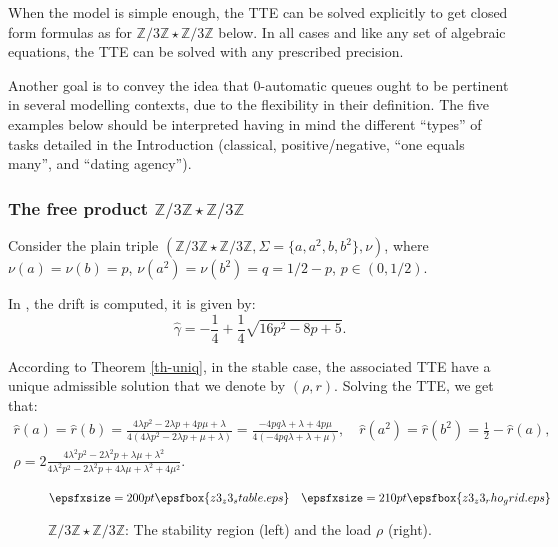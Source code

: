 \documentclass[11pt,a4paper]{article}
\theoremstyle{remark}
\def\Blackboardfont{\mathbb}
\def\Z{{\Blackboardfont Z}}
\begin{document}
When the model is simple enough,
the TTE can be solved explicitly 
to get closed form formulas as for  $\Z/3\Z \star \Z/3\Z$ below.
In all cases and like any set of algebraic equations, the TTE can
be solved with any prescribed precision.

\medskip

Another goal is to convey the
idea that 0-automatic queues ought to be pertinent in several
modelling contexts, due to the flexibility in their definition.
The five examples below should be interpreted having in mind the 
different ``types'' of tasks detailed in the Introduction (classical,
positive/negative, ``one equals many'', and ``dating agency''). 













\subsubsection{The free product $\Z/3\Z\star \Z/3\Z$} 

Consider the plain triple $(\Z/3\Z\star
\Z/3\Z,\Sigma=\{a,a^2,b,b^2\}, \nu)$, where $\nu(a)=\nu(b)=p$,
$\nu(a^2)=\nu(b^2)=q=1/2-p$, $p\in (0,1/2)$.

In \cite[Section 4.2]{MaMa}, the drift is computed, it is given
by:
$$\widehat{\gamma}=-\frac{1}{4}+\frac{1}{4}\sqrt{16p^2-8p+5}.$$

According to Theorem \ref{th-uniq}, in the stable case, the associated TTE have a
unique admissible solution that we denote by $(\rho,r)$. Solving
the TTE, we get that:
\begin{eqnarray*}
\widehat{r}(a)=\widehat{r}(b)=\frac{4\lambda p^2-2\lambda
p+4p\mu+\lambda}{4(4\lambda p^2-2\lambda
p+\mu+\lambda)}=\frac{-4pq\lambda+\lambda+4p\mu}{4(-4pq\lambda+\lambda+\mu)},
\quad \widehat{r}(a^2)=\widehat{r}(b^2)=
\frac{1}{2} - \widehat{r}(a),\\
\rho=2\frac{4\lambda^2 p^2-2\lambda^2 p
+\lambda\mu+\lambda^2}{4\lambda^2 p^2-2\lambda^2 p
+4\lambda\mu+\lambda^2+4\mu^2}.
\quad\quad\quad\quad\quad\quad\quad
\end{eqnarray*}

\begin{figure}[ht]
\[ \epsfxsize=200pt \epsfbox{z3_z3_stable.eps} \quad \epsfxsize=210pt \epsfbox{z3_z3_rho_grid.eps} \]
\caption{$\Z/3\Z\star \Z/3\Z$: The stability region (left) and the
  load $\rho$ (right).} \label{f-z3-z3}
\end{figure}
\end{document}
